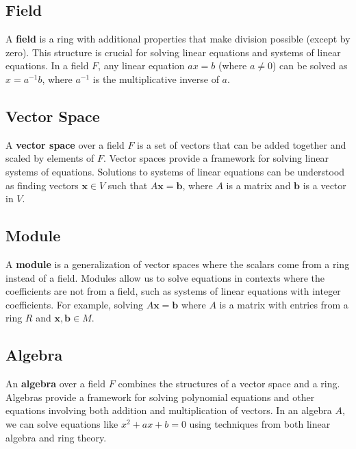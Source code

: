 \documentclass[12pt,openany]{book}
\begin{document}
	\subsection*{Field}
	A \textbf{field} is a ring with additional properties that make division possible (except by zero). This structure is crucial for solving linear equations and systems of linear equations. In a field \( F \), any linear equation \( ax = b \) (where \( a \neq 0 \)) can be solved as \( x = a^{-1}b \), where \( a^{-1} \) is the multiplicative inverse of \( a \).
	
	\subsection*{Vector Space}
	A \textbf{vector space} over a field \( F \) is a set of vectors that can be added together and scaled by elements of \( F \). Vector spaces provide a framework for solving linear systems of equations. Solutions to systems of linear equations can be understood as finding vectors \( \mathbf{x} \in V \) such that \( A\mathbf{x} = \mathbf{b} \), where \( A \) is a matrix and \( \mathbf{b} \) is a vector in \( V \).
	
	\subsection*{Module}
	A \textbf{module} is a generalization of vector spaces where the scalars come from a ring instead of a field. Modules allow us to solve equations in contexts where the coefficients are not from a field, such as systems of linear equations with integer coefficients. For example, solving \( A\mathbf{x} = \mathbf{b} \) where \( A \) is a matrix with entries from a ring \( R \) and \( \mathbf{x}, \mathbf{b} \in M \).
	
	\subsection*{Algebra}
	An \textbf{algebra} over a field \( F \) combines the structures of a vector space and a ring. Algebras provide a framework for solving polynomial equations and other equations involving both addition and multiplication of vectors. In an algebra \( A \), we can solve equations like \( x^2 + ax + b = 0 \) using techniques from both linear algebra and ring theory.
	
\end{document}
